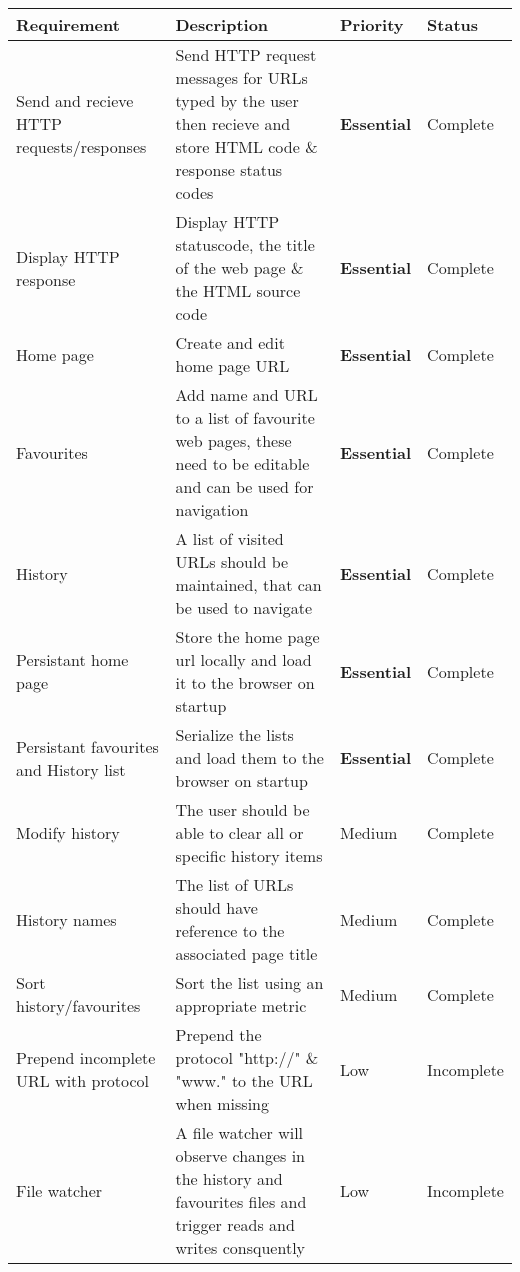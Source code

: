 \documentclass[../Main.tex]{subfiles}
\begin{document}
\begin{center}
        \begin{longtable}{|p{3cm}|p{7cm}|l|p{2cm}|}
            \hline
            \textbf{Requirement} & \textbf{Description} & \textbf{Priority} & \textbf{Status}\\
            \hline \endhead
            Send and recieve HTTP requests/responses & Send HTTP request messages for URLs typed by the user then recieve and store HTML code \& response status codes & \textbf{Essential} & Complete\\
            \hline
            Display HTTP response & Display HTTP statuscode, the title of the web page \& the HTML source code & \textbf{Essential} & Complete\\
            \hline
            Home page & Create and edit home page URL & \textbf{Essential} & Complete \\
            \hline
            Favourites & Add name and URL to a list of favourite web pages, these need to be editable and can be used for navigation & \textbf{Essential} & Complete \\
            \hline
            History & A list of visited URLs should be maintained, that can be used to navigate & \textbf{Essential} & Complete\\
            \hline
            Persistant home page & Store the home page url locally and load it to the browser on startup & \textbf{Essential} & Complete \\
            \hline
            Persistant favourites and History list & Serialize the lists and load them to the browser on startup & \textbf{Essential} & Complete \\
            \hline
            Modify history & The user should be able to clear all or specific history items & Medium & Complete\\
            \hline
            History names & The list of URLs should have reference to the associated page title & Medium & Complete \\
            \hline 
            Sort history/favourites & Sort the list using an appropriate metric & Medium & Complete \\
            \hline
            Prepend incomplete URL with protocol & Prepend the protocol "http://" \& "www." to the URL when missing & Low & Incomplete \\
            \hline
            File watcher & A file watcher will observe changes in the history and favourites files and trigger reads and writes consquently & Low & Incomplete\\
            \hline
        \end{longtable}
        \label{tab:ModelRequirements}
\end{center}
\pagebreak
\end{document}
